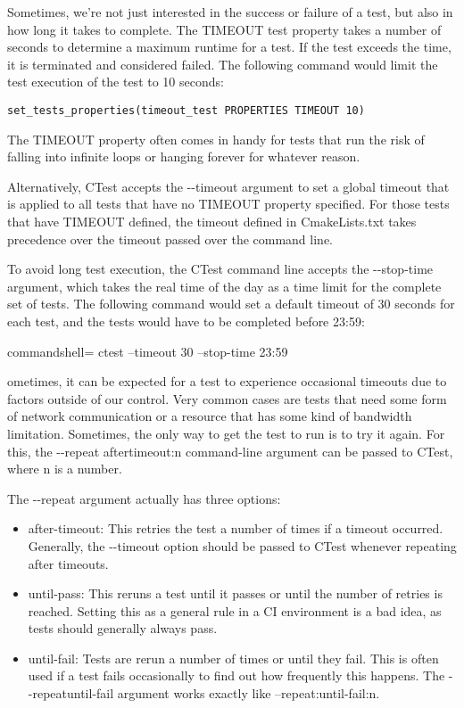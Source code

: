
Sometimes, we're not just interested in the success or failure of a test, but also in how long it takes to complete. The TIMEOUT test property takes a number of seconds to determine a maximum runtime for a test. If the test exceeds the time, it is terminated and considered failed. The following command would limit the test execution of the test to 10 seconds:

\begin{lstlisting}[style=styleCMake]
set_tests_properties(timeout_test PROPERTIES TIMEOUT 10)
\end{lstlisting}

The TIMEOUT property often comes in handy for tests that run the risk of falling into infinite loops or hanging forever for whatever reason.

Alternatively, CTest accepts the -{}-timeout argument to set a global timeout that is applied to all tests that have no TIMEOUT property specified. For those tests that have TIMEOUT defined, the timeout defined in CmakeLists.txt takes precedence over the timeout passed over the command line.

To avoid long test execution, the CTest command line accepts the -{}-stop-time argument, which takes the real time of the day as a time limit for the complete set of tests. The following command would set a default timeout of 30 seconds for each test, and the tests would have to be completed before 23:59:

\begin{tcblisting}{commandshell={}}
ctest --timeout 30 --stop-time 23:59
\end{tcblisting}

ometimes, it can be expected for a test to experience occasional timeouts due to factors outside of our control. Very common cases are tests that need some form of network communication or a resource that has some kind of bandwidth limitation. Sometimes, the only way to get the test to run is to try it again. For this, the -{}-repeat aftertimeout:n command-line argument can be passed to CTest, where n is a number.

The -{}-repeat argument actually has three options:

\begin{itemize}
\item 
after-timeout: This retries the test a number of times if a timeout occurred. Generally, the -{}-timeout option should be passed to CTest whenever repeating after timeouts.

\item 
until-pass: This reruns a test until it passes or until the number of retries is reached. Setting this as a general rule in a CI environment is a bad idea, as tests should generally always pass.

\item 
until-fail: Tests are rerun a number of times or until they fail. This is often used if a test fails occasionally to find out how frequently this happens. The -{}-repeatuntil-fail argument works exactly like --repeat:until-fail:n. 
\end{itemize}

